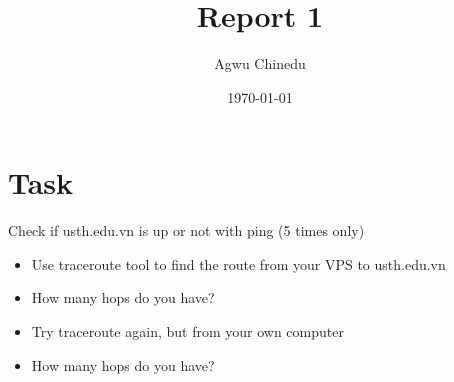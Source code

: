 \documentclass[letterpaper,12pt]{article}
\begin{document}
\title{Report 1}
\author{Agwu Chinedu}
\date{\today}
\maketitle


\section{Task}

Check if usth.edu.vn is up or not with ping (5 times only)
\begin{itemize}
\item Use traceroute tool to find the route from your VPS to
usth.edu.vn
\item How many hops do you have?
\item Try traceroute again, but from your own computer
\item How many hops do you have?
\end{itemize}
\end{document}
